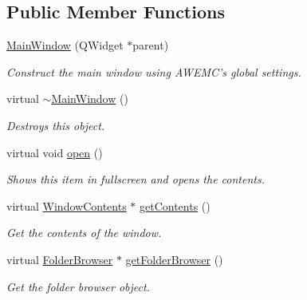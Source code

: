 \subsection*{Public Member Functions}
\begin{DoxyCompactItemize}
\item 
\hyperlink{class_u_i_1_1_main_window_ae7344f408a563bc6d9b1acd225da52cb}{Main\-Window} (Q\-Widget $\ast$parent)
\begin{DoxyCompactList}\small\item\em Construct the main window using A\-W\-E\-M\-C's global settings. \end{DoxyCompactList}\item 
\hypertarget{class_u_i_1_1_main_window_ae98d00a93bc118200eeef9f9bba1dba7}{virtual \hyperlink{class_u_i_1_1_main_window_ae98d00a93bc118200eeef9f9bba1dba7}{$\sim$\-Main\-Window} ()}\label{class_u_i_1_1_main_window_ae98d00a93bc118200eeef9f9bba1dba7}

\begin{DoxyCompactList}\small\item\em Destroys this object. \end{DoxyCompactList}\item 
\hypertarget{class_u_i_1_1_main_window_aa7473e4bbbcc281706ac2edef864fb45}{virtual void \hyperlink{class_u_i_1_1_main_window_aa7473e4bbbcc281706ac2edef864fb45}{open} ()}\label{class_u_i_1_1_main_window_aa7473e4bbbcc281706ac2edef864fb45}

\begin{DoxyCompactList}\small\item\em Shows this item in fullscreen and opens the contents. \end{DoxyCompactList}\item 
virtual \hyperlink{class_u_i_1_1_window_contents}{Window\-Contents} $\ast$ \hyperlink{class_u_i_1_1_main_window_a5c3f83f13c1b8d8b2f566ae845d30825}{get\-Contents} ()
\begin{DoxyCompactList}\small\item\em Get the contents of the window. \end{DoxyCompactList}\item 
virtual \hyperlink{class_u_i_1_1_folder_browser}{Folder\-Browser} $\ast$ \hyperlink{class_u_i_1_1_main_window_a8c37a5d0b8ad0110f820d4a7c5fadbf7}{get\-Folder\-Browser} ()
\begin{DoxyCompactList}\small\item\em Get the folder browser object. \end{DoxyCompactList}\end{DoxyCompactItemize}
